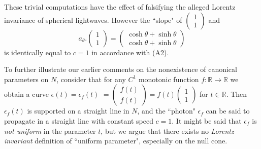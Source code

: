 \documentclass[12pt]{article}
\newcommand{\bR}{\mathbb{R}}
\begin{document}
These trivial computations have the effect of falsifying the alleged Lorentz invariance of spherical lightwaves. However the ``slope" of $\begin{pmatrix} 1 \\ 1\end{pmatrix}$ and $$a_\theta.\begin{pmatrix} 1 \\ 1\end{pmatrix}=\begin{pmatrix} \cosh \theta+\sinh \theta \\ \cosh \theta+\sinh \theta \end{pmatrix}$$ is identically equal to $c=1$ in accordance with (A2).

To further illustrate our earlier comments on the nonexistence of canonical parameters on $N$, consider that for any $C^1$ monotonic function $f: \bR \to \bR$ we obtain a curve $\epsilon(t)=\epsilon_f(t)$ $=\begin{pmatrix} f(t) \\ f(t)   \end{pmatrix}=f(t) \begin{pmatrix} 1 \\ 1 \end{pmatrix}$ for $t\in \bR$. Then $\epsilon_f(t)$ is supported on a straight line in $N$, and the ``photon" $\epsilon_f$ can be said to propagate in a straight line with constant speed $c=1$. It might be said that $\epsilon_f$ is \emph{not uniform} in the parameter $t$, but we argue that there exists no \emph{Lorentz invariant} definition of ``uniform parameter", especially on the null cone. 




\end{document}
